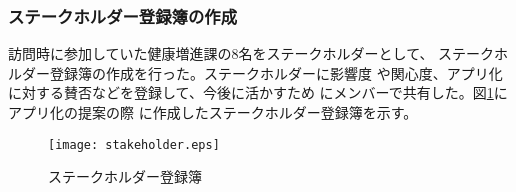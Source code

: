 ﻿\subsubsection{ステークホルダー登録簿の作成}
訪問時に参加していた健康増進課の8名をステークホルダーとして、
ステークホルダー登録簿の作成を行った。ステークホルダーに影響度
や関心度、アプリ化に対する賛否などを登録して、今後に活かすため
にメンバーで共有した。図\ref{fig:addsh}にアプリ化の提案の際
に作成したステークホルダー登録簿を示す。

\begin{figure}[htbp]
\centering
\texttt{[image: stakeholder.eps]}
\caption{ステークホルダー登録簿}
\label{fig:addsh}
\end{figure}

